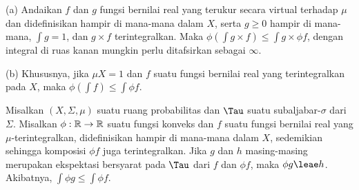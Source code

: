 (a) Andaikan $f$ dan $g$ fungsi bernilai real yang terukur secara virtual
terhadap $\mu$ dan didefinisikan hampir di mana-mana dalam $X$, serta
$g\ge 0$ hampir di mana-mana, $\int g=1$, dan $g\times f$
terintegralkan. Maka $\phi(\int g\times f)\le\int g\times\phi f$, dengan
integral di ruas kanan mungkin perlu ditafsirkan sebagai $\infty$.

(b) Khususnya, jika $\mu X=1$ dan $f$ suatu fungsi bernilai real yang
terintegralkan pada $X$, maka $\phi(\int f)\le\int\phi f$.


 Misalkan $(X,\Sigma,\mu)$ suatu ruang
probabilitas dan $\Tau$ suatu subaljabar-$\sigma$ dari $\Sigma$.
Misalkan $\phi:\Bbb R\to\Bbb R$ suatu fungsi konveks dan $f$ suatu
fungsi bernilai real yang $\mu$-terintegralkan, didefinisikan hampir di
mana-mana dalam $X$, sedemikian sehingga komposisi $\phi f$ juga
terintegralkan. Jika $g$ dan $h$ masing-masing merupakan ekspektasi
bersyarat pada $\Tau$ dari $f$ dan $\phi f$, maka $\phi g\leae h$.
Akibatnya, $\int\phi g\le\int\phi f$.

